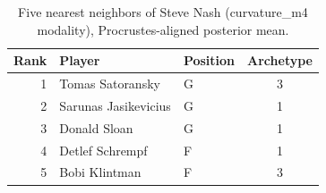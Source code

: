 \begin{table}[htbp]
  \centering\small
  \begin{tabular}{rllc}
    \toprule
    Rank & Player & Position & Archetype \\
    \midrule
    1 & Tomas Satoransky & G & 3 \\
    2 & Sarunas Jasikevicius & G & 1 \\
    3 & Donald Sloan & G & 1 \\
    4 & Detlef Schrempf & F & 1 \\
    5 & Bobi Klintman & F & 3 \\
    \bottomrule
  \end{tabular}
  \caption{Five nearest neighbors of Steve Nash (curvature_m4 modality), Procrustes-aligned posterior mean.}
  \label{tab:Steve_Nash_neighbors_curvature_m4}
\end{table}

